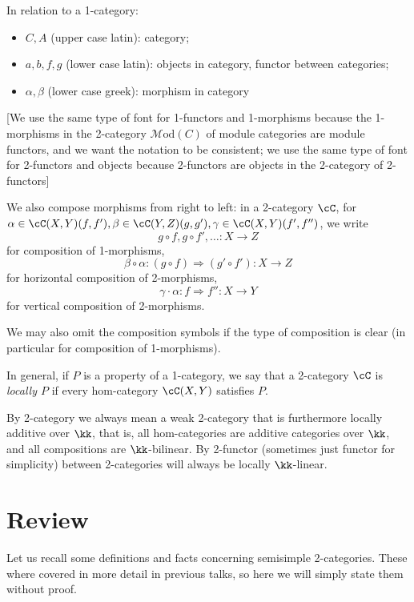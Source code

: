 \documentclass[12pt]{article}
\newcommand{\Mod}{{\mathcal{M}\textrm{od}}}
\begin{document}
In relation to a 1-category:
\begin{itemize}
\item $C,A$ (upper case latin): category;

\item $a,b,f,g$ (lower case latin): objects in category,
	functor between categories;

\item $\alpha,\beta$ (lower case greek): morphism in category
\end{itemize}

[We use the same type of font for 1-functors and 1-morphisms
because the 1-morphisms in the 2-category $\Mod(C)$
of module categories are module functors,
and we want the notation to be consistent;
we use the same type of font for 2-functors and objects
because 2-functors are objects in the 2-category of
2-functors]

We also compose morphisms from right to left:
in a 2-category $\cC$,
for $\alpha \in \cC(X,Y)(f,f'),
\beta \in \cC(Y,Z)(g,g'),
\gamma \in \cC(X,Y)(f',f'')$,
we write
\[
g \circ f, g \circ f', \ldots : X \to Z
\]
for composition of 1-morphisms,
\[
\beta \circ \alpha: (g \circ f) \Rightarrow (g' \circ f'):
	X \to Z
\]
for horizontal composition of 2-morphisms,
\[
\gamma \cdot \alpha: f \Rightarrow f'' : X \to Y
\]
for vertical composition of 2-morphisms.


We may also omit the composition symbols
if the type of composition is clear
(in particular for composition of 1-morphisms).



In general, if $P$ is a property of a 1-category,
we say that a 2-category $\cC$ is \emph{locally $P$}
if every hom-category $\cC(X,Y)$ satisfies $P$.

By 2-category we always mean a weak 2-category
that is furthermore locally additive over $\kk$,
that is, all hom-categories are
additive categories over $\kk$,
and all compositions are $\kk$-bilinear.
By 2-functor (sometimes just functor for simplicity)
between 2-categories will always be locally $\kk$-linear.


\section{Review}

Let us recall some definitions and facts concerning
semisimple 2-categories.
These where covered in more detail in previous talks,
so here we will simply state them without proof.
\end{document}
